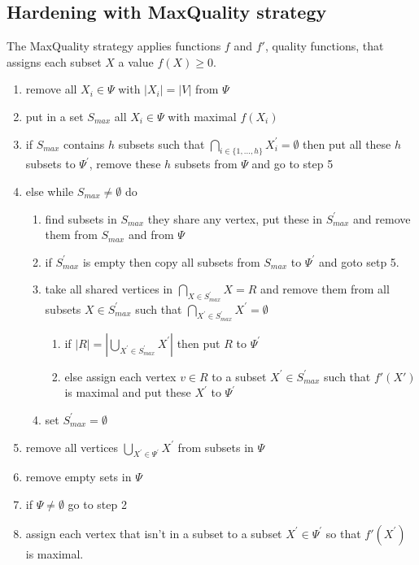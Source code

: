 \documentclass[a4paper, 11pt]{article}
\begin{document}
	\subsection{Hardening with MaxQuality strategy}
		The MaxQuality strategy applies functions $f$ and $f'$,  quality functions, that assigns each subset $X$ a value $f(X)\ge0$.
		\begin{enumerate}
			\item remove all $X_{i} \in \Psi$ with $|X_i|=|V|$ from $\Psi$
			\item put in a set $S_{max}$ all  $X_{i} \in \Psi$ with maximal $f(X_{i})$
			\item if $S_{max}$ contains $h$ subsets such that $\bigcap_{i\in\{1,...,h\}} X^{'}_{i} = \emptyset$ then
				put all these $h$ subsets to $\Psi^{'}$, remove these $h$ subsets from $\Psi$ and go to step 5
			\item else while $S_{max} \neq \emptyset$ do
				\begin{enumerate}
				\item find subsets in $S_{max}$ they share any vertex, put these in $S^{'}_{max}$ and remove them from $S_{max}$ and from $\Psi$
				\item if $S^{'}_{max}$ is empty then copy all subsets from $S_{max}$ to $\Psi^{'}$ and goto setp 5.
				\item take all shared vertices in $\bigcap_{X\in S^{'}_{max}} X = R$ and remove them from all subsets $X \in S^{'}_{max}$ such that
				$\bigcap_{X^{'} \in S^{'}_{max}} X^{'} = \emptyset$
					\begin{enumerate}
						\item if $|R| = |\bigcup_{X^{'}\in S^{'}_{max}} X^{'}|$ then put $R$ to $\Psi^{'}$
						\item else assign each vertex $v \in R$ to a subset $X^{'} \in S^{'}_{max}$  such that $f'(X')$ is maximal and put these $X^{'}$ to $\Psi^{'}$
					\end{enumerate}
				\item set $S^{'}_{max} = \emptyset$
				\end{enumerate}
			\item remove all vertices $\bigcup_{X^{'}\in \Psi^{'}} X^{'}$ from subsets in $\Psi$
			\item remove empty sets in $\Psi$
			\item if $\Psi \neq \emptyset$ go to step 2
			\item assign each vertex that isn't in a subset to a subset $X^{'}\in \Psi^{'}$ so that $f'(X^{'})$ is maximal.
		\end{enumerate}
\end{document}
